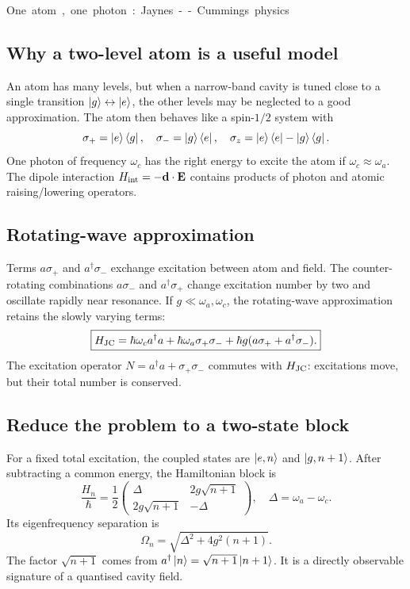 \unit{One atom, one photon: Jaynes--Cummings physics}
\subsection{Why a two-level atom is a useful model}
An atom has many levels, but when a narrow-band
cavity is tuned close to a single transition
\(\left\lvert g\right\rangle\leftrightarrow\left\lvert e\right\rangle\), the other
levels may be neglected to a good approximation.
The atom then behaves like a spin-\(1/2\)
system with
\[
\sigma_+=\left\lvert e\right\rangle\left\langle g\right\rvert,\quad
\sigma_-=\left\lvert g\right\rangle\left\langle e\right\rvert,\quad
\sigma_z=\left\lvert e\right\rangle\left\langle e\right\rvert-\left\lvert g\right\rangle\left\langle g\right\rvert.
\]
One photon of frequency \(\omega_c\) has
the right energy to excite the atom if
\(\omega_c\approx\omega_a\).
The dipole interaction
\(H_{\rm int}=-\mathbf d\cdot\mathbf E\)
contains products of photon and atomic
raising/lowering operators.

\subsection{Rotating-wave approximation}
Terms \(a\sigma_+\) and \(a^\dagger\sigma_-\)
exchange excitation between atom and field.
The counter-rotating combinations
\(a\sigma_-\) and \(a^\dagger\sigma_+\)
change excitation number by two and
oscillate rapidly near resonance.
If \(g\ll\omega_a,\omega_c\), the
rotating-wave approximation retains
the slowly varying terms:
\[
\boxed{H_{\rm JC}=
\hbar\omega_c a^\dagger a+
\hbar\omega_a\sigma_+\sigma_-+
\hbar g(a\sigma_++a^\dagger\sigma_-).}
\]
The excitation operator
\(N=a^\dagger a+\sigma_+\sigma_-\)
commutes with \(H_{\rm JC}\):
excitations move, but their total number is conserved.

\subsection{Reduce the problem to a two-state block}
For a fixed total excitation,
the coupled states are
\(\left\lvert e,n\right\rangle\) and \(\left\lvert g,n+1\right\rangle\).
After subtracting a common energy, the
Hamiltonian block is
\[
\frac{H_n}{\hbar}=
\frac12\begin{pmatrix}
\Delta&2g\sqrt{n+1}\\
2g\sqrt{n+1}&-\Delta
\end{pmatrix},
\quad \Delta=\omega_a-\omega_c.
\]
Its eigenfrequency separation is
\[
\boxed{\Omega_n=
\sqrt{\Delta^2+4g^2(n+1)}}.
\]
The factor \(\sqrt{n+1}\) comes from
\(a^\dagger\left\lvert n\right\rangle=\sqrt{n+1}\left\lvert n+1\right\rangle\).
It is a directly observable signature
of a quantised cavity field.


